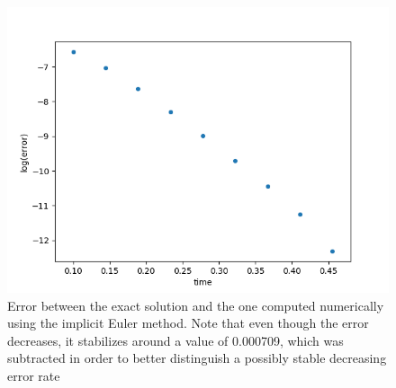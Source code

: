 \begin{figure}[H]
	\centering
	\includegraphics[width=\textwidth]{error_d.png} 
	\caption{Error between the exact solution and the one computed numerically using the implicit Euler method. Note that even though the error decreases, it stabilizes around a value of 0.000709, which was subtracted in order to better distinguish a possibly stable decreasing error rate }
	\label{fig:error_d}
\end{figure}